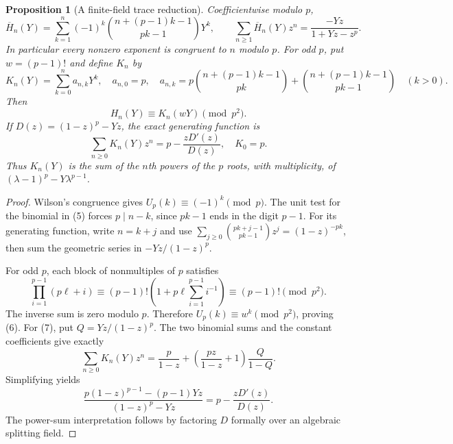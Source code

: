 \documentclass[11pt]{article}
\newtheorem{proposition}[theorem]{Proposition}
\begin{document}
\begin{proposition}[A finite-field trace reduction]\label{prop:trace}
Coefficientwise modulo $p$,
\[
 \overline H_n(Y)=\sum_{k=1}^n(-1)^k
        \binom{n+(p-1)k-1}{pk-1}Y^k,\qquad
 \sum_{n\ge1}\overline H_n(Y)z^n
       =\frac{-Yz}{1+Yz-z^p}.                             \tag{5}
\]
In particular every nonzero exponent is congruent to $n$
modulo $p$. For odd $p$, put $w=(p-1)!$ and define $K_n$ by
\[
 K_n(Y)=\sum_{k=0}^n a_{n,k}Y^k,\quad a_{n,0}=p,\quad
 a_{n,k}=p\binom{n+(p-1)k-1}{pk}
              +\binom{n+(p-1)k-1}{pk-1}\quad(k>0).
\]
Then
\[
 H_n(Y)\equiv K_n(wY)\pmod {p^2}.                         \tag{6}
\]
If $D(z)=(1-z)^p-Yz$, the exact generating function is
\[
 \sum_{n\ge0}K_n(Y)z^n=p-\frac{zD'(z)}{D(z)},\quad K_0=p. \tag{7}
\]
Thus $K_n(Y)$ is the sum of the $n$th powers of the $p$ roots,
with multiplicity, of $(\lambda-1)^p-Y\lambda^{p-1}$.
\end{proposition}
\begin{proof}
Wilson's congruence gives $U_p(k)\equiv(-1)^k\pmod p$.
The unit test for the binomial in (5) forces $p\mid n-k$,
since $pk-1$ ends in the digit $p-1$. For its generating function,
write $n=k+j$ and use
$\sum_{j\ge0}\binom{pk+j-1}{pk-1}z^j=(1-z)^{-pk}$,
then sum the geometric series in $-Yz/(1-z)^p$.

For odd $p$, each block of nonmultiples of $p$ satisfies
\[
 \prod_{i=1}^{p-1}(p\ell+i)
 \equiv(p-1)!\left(1+p\ell\sum_{i=1}^{p-1}i^{-1}\right)
 \equiv(p-1)!\pmod {p^2}.
\]
The inverse sum is zero modulo $p$. Therefore
$U_p(k)\equiv w^k\pmod {p^2}$, proving (6).
For (7), put $Q=Yz/(1-z)^p$. The two binomial
sums and the constant coefficients give exactly
\[
 \sum_{n\ge0}K_n(Y)z^n
   =\frac{p}{1-z}
      +\left(\frac{pz}{1-z}+1\right)\frac{Q}{1-Q}.
\]
Simplifying yields
\[
 \frac{p(1-z)^{p-1}-(p-1)Yz}{(1-z)^p-Yz}
       =p-\frac{zD'(z)}{D(z)}.
\]
The power-sum interpretation follows by factoring $D$ formally
over an algebraic splitting field.
\end{proof}
\end{document}
